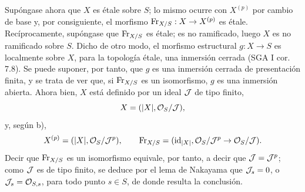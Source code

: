Supóngase ahora que $X$ es étale sobre $S$; lo mismo ocurre con $X^{(p)}$ por cambio de base y, por consiguiente, el morfismo $\operatorname{Fr}_{X/S}:X\to X^{(p)}$ es étale. Recíprocamente, supóngase que $\operatorname{Fr}_{X/S}$ es étale; es no ramificado, luego $X$ es no ramificado sobre $S$. Dicho de otro modo, el morfismo estructural $g:X\to S$ es localmente sobre $X$, para la topología étale, una inmersión cerrada (SGA I cor. 7.8). Se puede suponer, por tanto, que $g$ es una inmersión cerrada de presentación finita, y se trata de ver que, si $\operatorname{Fr}_{X/S}$ es un isomorfismo, $g$ es una inmersión abierta. Ahora bien, $X$ está definido por un ideal $\mathcal J$ de tipo finito,
\[
X=(|X|,\mathcal{O}_S/\mathcal J),
\]
y, según b),
\[
X^{(p)}=(|X|,\mathcal{O}_S/\mathcal J^p),
\qquad
\operatorname{Fr}_{X/S}=(\operatorname{id}_{|X|},\mathcal{O}_S/\mathcal J^p\to\mathcal{O}_S/\mathcal J).
\]
Decir que $\operatorname{Fr}_{X/S}$ es un isomorfismo equivale, por tanto, a decir que $\mathcal J=\mathcal J^p$; como $\mathcal J$ es de tipo finito, se deduce por el lema de Nakayama que $\mathcal J_s=0$, o $\mathcal J_s=\mathcal{O}_{S,s}$, para todo punto $s\in S$, de donde resulta la conclusión.

